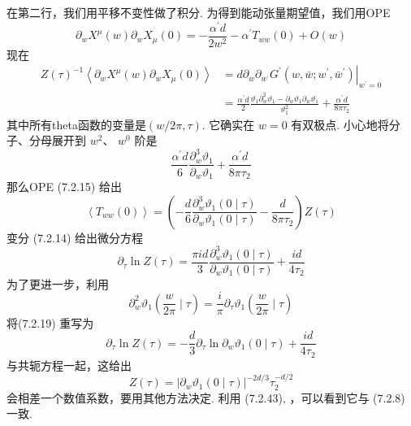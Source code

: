 在第二行，我们用平移不变性做了积分. 为得到能动张量期望值，我们用OPE
\begin{equation}
\partial_{w} X^{\mu}(w) \partial_{w} X_{\mu}(0)=-\frac{\alpha^{\prime} d}{2 w^{2}}-\alpha^{\prime} T_{w w}(0)+O(w)
\end{equation}
现在
\begin{equation}
\begin{aligned}
Z(\tau)^{-1}\left\langle\partial_{w} X^{\mu}(w) \partial_{w} X_{\mu}(0)\right\rangle &=\left.d \partial_{w} \partial_{w^{\prime}} G^{\prime}\left(w, \bar{w} ; w^{\prime}, \bar{w}^{\prime}\right)\right|_{w^{\prime}=0} \\
&=\frac{\alpha^{\prime} d}{2} \frac{\vartheta_{1} \partial_{w}^{2} \vartheta_{1}-\partial_{w} \vartheta_{1} \partial_{w} \vartheta_{1}}{\vartheta_{1}^{2}}+\frac{\alpha^{\prime} d}{8 \pi \tau_{2}}
\end{aligned}
\end{equation}
其中所有theta函数的变量是$(w / 2 \pi, \tau)$. 它确实在 $w=0 $ 有双极点. 小心地将分子、分母展开到 $w^{2}$、 $w^{0}$ 阶是
\begin{equation}
\frac{\alpha^{\prime} d}{6} \frac{\partial_{w}^{3} \vartheta_{1}}{\partial_{w} \vartheta_{1}}+\frac{\alpha^{\prime} d}{8 \pi \tau_{2}}
\end{equation}
那么OPE (7.2.15) 给出
\begin{equation}
\left\langle T_{w w}(0)\right\rangle=\left(-\frac{d}{6} \frac{\partial_{w}^{3} \vartheta_{1}(0 \mid \tau)}{\partial_{w} \vartheta_{1}(0 \mid \tau)}-\frac{d}{8 \pi \tau_{2}}\right) Z(\tau)
\end{equation}
变分 (7.2.14) 给出微分方程
\begin{equation}
\partial_{\tau} \ln Z(\tau)=\frac{\pi i d}{3} \frac{\partial_{w}^{3} \vartheta_{1}(0 \mid \tau)}{\partial_{w} \vartheta_{1}(0 \mid \tau)}+\frac{i d}{4 \tau_{2}}
\end{equation}
为了更进一步，利用
\begin{equation}
\partial_{w}^{2} \vartheta_{1}\left(\frac{w}{2 \pi} \mid \tau\right)=\frac{i}{\pi} \partial_{\tau} \vartheta_{1}\left(\frac{w}{2 \pi} \mid \tau\right)
\end{equation}
将(7.2.19) 重写为
\begin{equation}
\partial_{\tau} \ln Z(\tau)=-\frac{d}{3} \partial_{\tau} \ln \partial_{w} \vartheta_{1}(0 \mid \tau)+\frac{i d}{4 \tau_{2}}
\end{equation}
与共轭方程一起，这给出
\begin{equation}
Z(\tau)=\left|\partial_{w} \vartheta_{1}(0 \mid \tau)\right|^{-2 d / 3} \tau_{2}^{-d / 2}
\end{equation}
会相差一个数值系数，要用其他方法决定. 利用 (7.2.43), ，可以看到它与 (7.2.8)一致.\\

